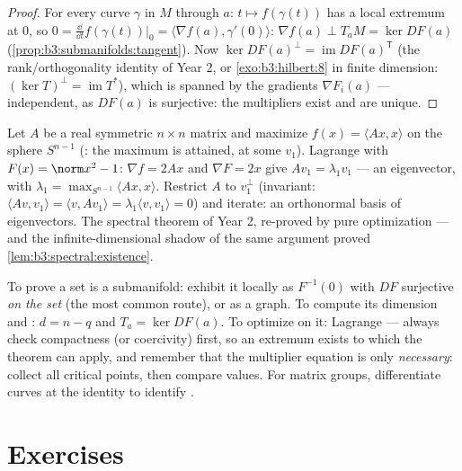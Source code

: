 \begin{proof}
For every curve $\gamma$ in $M$ through $a$: $t \mapsto
f(\gamma(t))$ has a local extremum at $0$, so $0 =
\frac{\dd}{\dd t}f(\gamma(t))\big|_0 = \langle\nabla f(a),
\gamma'(0)\rangle$: $\nabla f(a) \perp T_aM = \ker DF(a)$
(\cref{prop:b3:submanifolds:tangent}). Now $\ker DF(a)^\perp
= \operatorname{im}DF(a)^{\mathsf T}$ (the rank/orthogonality
identity of Year 2, or \cref{exo:b3:hilbert:8} in finite
dimension: $(\ker T)^\perp = \operatorname{im}T^*$), which is
spanned by the gradients $\nabla F_i(a)$ --- independent, as
$DF(a)$ is surjective: the multipliers exist and are unique.
\end{proof}

\begin{example}
\label{ex:b3:submanifolds:rayleigh}
Let $A$ be a real symmetric $n\times n$ matrix and maximize
$f(x) = \langle Ax, x\rangle$ on the sphere $S^{n-1}$
(: the maximum is attained, at some $v_1$). Lagrange
with $F(x) = \norm x^2 - 1$: $\nabla f = 2Ax$ and $\nabla F =
2x$ give $Av_1 = \lambda_1v_1$ --- an eigenvector, with
$\lambda_1 = \max_{S^{n-1}}\langle Ax, x\rangle$. Restrict
$A$ to $v_1^\perp$ (invariant: $\langle Av, v_1\rangle =
\langle v, Av_1\rangle = \lambda_1\langle v, v_1\rangle = 0$)
and iterate: an orthonormal basis of eigenvectors. The
spectral theorem of Year 2, re-proved by pure optimization
--- and the infinite-dimensional shadow of the same argument
proved \cref{lem:b3:spectral:existence}.
\end{example}

\begin{method}\label{met:b3:submanifolds:method}
To prove a set is a submanifold: exhibit it locally as
$F^{-1}(0)$ with $DF$ surjective \emph{on the set} (the most
common route), or as a graph. To compute its dimension and
: $d = n - q$ and $T_a = \ker DF(a)$. To
optimize on it: Lagrange --- always check compactness (or
coercivity) first, so an extremum exists to which the theorem
can apply, and remember that the multiplier equation is only
\emph{necessary}: collect all critical points, then compare
values. For matrix groups, differentiate curves at the
identity to identify .
\end{method}

\section{Exercises}

